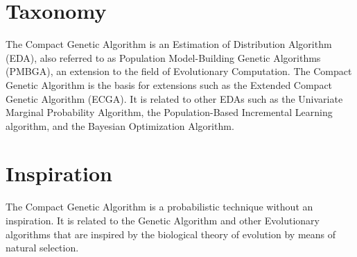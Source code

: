\documentclass[a4paper, 11pt]{article}
\begin{document}
\section{Taxonomy}
\label{sec:taxonomy}
The Compact Genetic Algorithm is an Estimation of Distribution Algorithm (EDA), also referred to as Population Model-Building Genetic Algorithms (PMBGA), an extension to the field of Evolutionary Computation.
The Compact Genetic Algorithm is the basis for extensions such as the Extended Compact Genetic Algorithm (ECGA).
It is related to other EDAs such as the Univariate Marginal Probability Algorithm, the Population-Based Incremental Learning algorithm, and the Bayesian Optimization Algorithm.

\section{Inspiration}
\label{sec:inspiration}
The Compact Genetic Algorithm is a probabilistic technique without an inspiration. It is related to the Genetic Algorithm and other Evolutionary algorithms that are inspired by the biological theory of evolution by means of natural selection.
\end{document}
